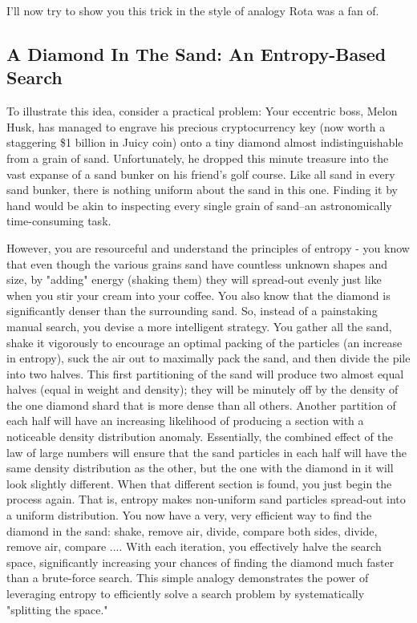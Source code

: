 \documentclass{report}
\begin{document}
I'll now try to show you this trick in the style of analogy Rota was a fan of.

\subsection*{A Diamond In The Sand: An Entropy-Based Search}

To illustrate this idea, consider a practical problem: Your eccentric boss, Melon Husk, has managed to engrave his precious cryptocurrency key (now worth a staggering \$1 billion in Juicy coin) onto a tiny diamond almost indistinguishable from a grain of sand. Unfortunately, he dropped this minute treasure into the vast expanse of a sand bunker on his friend's golf course. Like all sand in every sand bunker, there is nothing uniform about the sand in this one. Finding it by hand would be akin to inspecting every single grain of sand–an astronomically time-consuming task.

However, you are resourceful and understand the principles of entropy - you know that even though the various grains sand have countless unknown shapes and size, by "adding" energy (shaking them) they will spread-out evenly just like when you stir your cream into your coffee. You also know that the diamond is significantly denser than the surrounding sand. So, instead of a painstaking manual search, you devise a more intelligent strategy. You gather all the sand, shake it vigorously to encourage an optimal packing of the particles (an increase in entropy), suck the air out to maximally pack the sand, and then divide the pile into two halves. This first partitioning of the sand will produce two almost equal halves (equal in weight and density); they will be minutely off by the density of the one diamond shard that is more dense than all others. Another partition of each half will have an increasing likelihood of producing a section with a noticeable density distribution anomaly. Essentially, the combined effect of the law of large numbers will ensure that the sand particles in each half will have the same density distribution as the other, but the one with the diamond in it will look slightly different. When that different section is found, you just begin the process again. That is, entropy makes non-uniform sand particles spread-out into a uniform distribution. You now have a very, very efficient way to find the diamond in the sand: shake, remove air, divide, compare both sides, divide, remove air, compare .... With each iteration, you effectively halve the search space, significantly increasing your chances of finding the diamond much faster than a brute-force search. This simple analogy demonstrates the power of leveraging entropy to efficiently solve a search problem by systematically "splitting the space."
\end{document}
